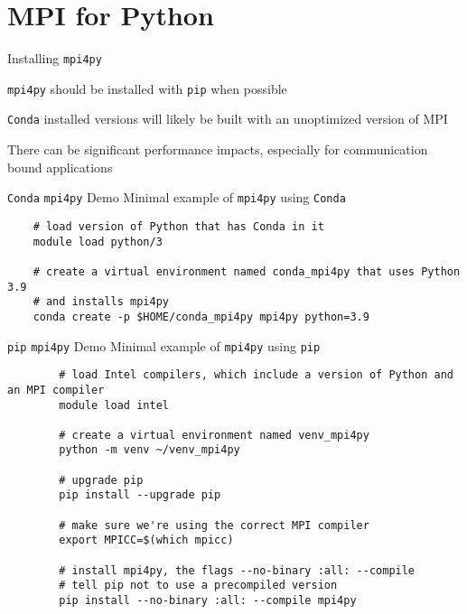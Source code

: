 \section{MPI for Python}

\begin{frame}{Installing  \texttt{mpi4py}}
\begin{description}
\item  \texttt{mpi4py} should be installed with \texttt{pip} when possible
\item \texttt{Conda} installed versions will likely be built with an unoptimized version of MPI
\item There can be significant performance impacts, especially for communication bound applications
\end{description}
\end{frame}

\begin{frame}[fragile]{\texttt{Conda} \texttt{mpi4py} Demo}
	Minimal example of  \texttt{mpi4py} using \texttt{Conda}
\begin{verbatim}
	# load version of Python that has Conda in it
	module load python/3
	
	# create a virtual environment named conda_mpi4py that uses Python 3.9 
	# and installs mpi4py
	conda create -p $HOME/conda_mpi4py mpi4py python=3.9 
\end{verbatim}
\end{frame}

\begin{frame}[fragile]{\texttt{pip} \texttt{mpi4py} Demo}
	Minimal example of  \texttt{mpi4py} using \texttt{pip}
	\begin{verbatim}
		# load Intel compilers, which include a version of Python and an MPI compiler
		module load intel
		
		# create a virtual environment named venv_mpi4py
		python -m venv ~/venv_mpi4py
		
		# upgrade pip
		pip install --upgrade pip
		
		# make sure we're using the correct MPI compiler
		export MPICC=$(which mpicc)
		
		# install mpi4py, the flags --no-binary :all: --compile 
		# tell pip not to use a precompiled version
		pip install --no-binary :all: --compile mpi4py
	\end{verbatim}
\end{frame}

